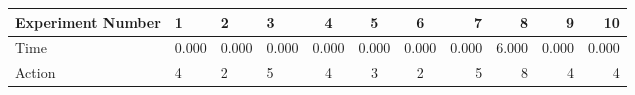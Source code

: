 \documentclass[8pt]{article}
\begin{document}
\begin{landscape}
\begin{tabular}{ | l | l | l | l | c | c | c | r | r | r | r | }
 \hline 
Experiment Number & 1 & 2 & 3 & 4 & 5 & 6 & 7 & 8 & 9 & 10\\ \hline
Time & 0.000 & 0.000 & 0.000 & 0.000 & 0.000 & 0.000 & 0.000 & 6.000 & 0.000 & 0.000\\ \hline
Action & 4 & 2 & 5 & 4 & 3 & 2 & 5 & 8 & 4 & 4\\ \hline\end{tabular}
\end{landscape}
\end{document}
